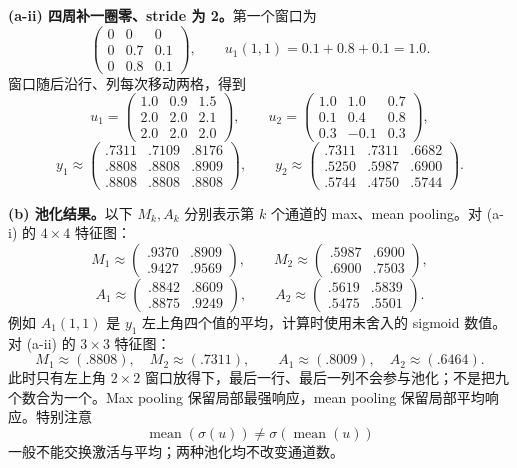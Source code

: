 \begin{checkedsolution}
\textbf{(a-ii) 四周补一圈零、stride 为 2。}第一个窗口为
\[
\begin{pmatrix}0&0&0\\0&0.7&0.1\\0&0.8&0.1\end{pmatrix},
\qquad u_1(1,1)=0.1+0.8+0.1=1.0.
\]
窗口随后沿行、列每次移动两格，得到
\[
u_1=\begin{pmatrix}1.0&0.9&1.5\\2.0&2.0&2.1\\2.0&2.0&2.0\end{pmatrix},\qquad
u_2=\begin{pmatrix}1.0&1.0&0.7\\0.1&0.4&0.8\\0.3&-0.1&0.3\end{pmatrix},
\]
\[
y_1\approx\begin{pmatrix}.7311&.7109&.8176\\.8808&.8808&.8909\\.8808&.8808&.8808\end{pmatrix},\qquad
y_2\approx\begin{pmatrix}.7311&.7311&.6682\\.5250&.5987&.6900\\.5744&.4750&.5744\end{pmatrix}.
\]

\textbf{(b) 池化结果。}以下 $M_k,A_k$ 分别表示第 $k$ 个通道的 max、mean pooling。对 (a-i) 的 $4\times4$ 特征图：
\[
M_1\approx\begin{pmatrix}.9370&.8909\\.9427&.9569\end{pmatrix},\qquad
M_2\approx\begin{pmatrix}.5987&.6900\\.6900&.7503\end{pmatrix},
\]
\[
A_1\approx\begin{pmatrix}.8842&.8609\\.8875&.9249\end{pmatrix},\qquad
A_2\approx\begin{pmatrix}.5619&.5839\\.5475&.5501\end{pmatrix}.
\]
例如 $A_1(1,1)$ 是 $y_1$ 左上角四个值的平均，计算时使用未舍入的 sigmoid 数值。对 (a-ii) 的 $3\times3$ 特征图：
\[
M_1\approx(.8808),\quad M_2\approx(.7311),\qquad
A_1\approx(.8009),\quad A_2\approx(.6464).
\]
此时只有左上角 $2\times2$ 窗口放得下，最后一行、最后一列不会参与池化；不是把九个数合为一个。Max pooling 保留局部最强响应，mean pooling 保留局部平均响应。特别注意
\[
\operatorname{mean}(\sigma(u))\ne\sigma(\operatorname{mean}(u))
\]
一般不能交换激活与平均；两种池化均不改变通道数。
\end{checkedsolution}

